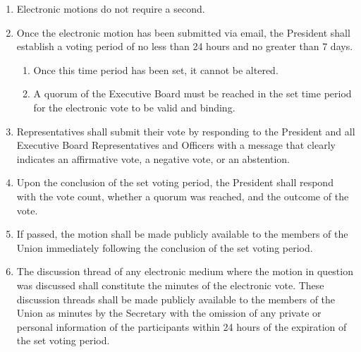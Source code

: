 \begin{enumerate}
\begin{enumerate}
    \begin{enumerate}
    \item The President may use another medium for an electronic vote with the approval of the Vice Presidents as long as all Representatives and Officers of the Executive Board are included in that medium.
    \end{enumerate}
  \item Electronic motions do not require a second.
  \item Once the electronic motion has been submitted via email, the President shall establish a voting period of no less than 24 hours and no greater than 7 days.
    \begin{enumerate}
    \item Once this time period has been set, it cannot be altered.
    \item A quorum of the Executive Board must be reached in the set time period for the electronic vote to be valid and binding.
    \end{enumerate}
  \item Representatives shall submit their vote by responding to the President and all Executive Board Representatives and Officers with a message that clearly indicates an affirmative vote, a negative vote, or an abstention.
  \item Upon the conclusion of the set voting period, the President shall respond with the vote count, whether a quorum was reached, and the outcome of the vote.
  \item If passed, the motion shall be made publicly available to the members of the Union immediately following the conclusion of the set voting period.
  \item The discussion thread of any electronic medium where the motion in question was discussed shall constitute the minutes of the electronic vote. These discussion threads shall be made publicly available to the members of the Union as minutes by the Secretary with the omission of any private or personal information of the participants within 24 hours of the expiration of the set voting period.
  \end{enumerate}
\end{enumerate}


